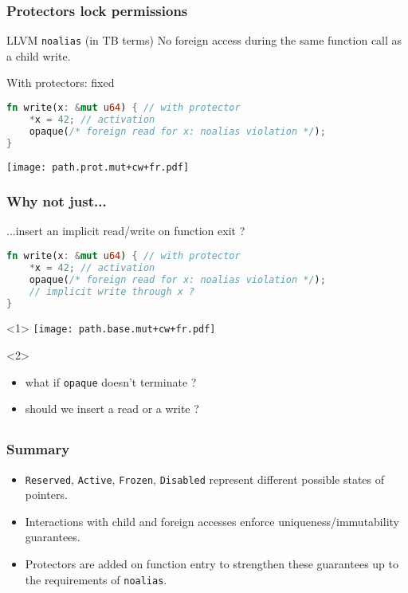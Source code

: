\begin{frame}[fragile]
    \frametitle{Protectors lock permissions}
    \begin{alertblock}{LLVM \texttt{noalias} (in TB terms)}
        No foreign access during the same function call as a child write.
    \end{alertblock}

    \begin{block}{With protectors: fixed}
        \begin{lstlisting}[language=rust, escapechar=@]
fn write(x: &mut u64) { // with protector
    *x = 42; // activation
    opaque(/* foreign read for x: noalias violation */);
}
        \end{lstlisting}
    \end{block}
    \texttt{[image: path.prot.mut+cw+fr.pdf]}
\end{frame}

\begin{frame}[fragile, t]
    \frametitle{Why not just...}
    \begin{block}{...insert an implicit read/write on function exit ?}
        \begin{lstlisting}[language=rust, escapechar=@]
fn write(x: &mut u64) { // with protector
    *x = 42; // activation
    opaque(/* foreign read for x: noalias violation */);
    // implicit write through x ?
}
        \end{lstlisting}
    \end{block}
    \begin{onlyenv}<1>
        \texttt{[image: path.base.mut+cw+fr.pdf]}
    \end{onlyenv}
    \begin{onlyenv}<2>
        \begin{itemize}
            \item what if \texttt{opaque} doesn't terminate ?
            \item should we insert a read or a write ?
        \end{itemize}
    \end{onlyenv}
\end{frame}


\subsection*{}

\begin{frame}
    \frametitle{Summary}
    \begin{itemize}
        \item \texttt{Reserved}, \texttt{Active}, \texttt{Frozen}, \texttt{Disabled}
            represent different possible states of pointers.\\
        \item Interactions with child and foreign accesses enforce uniqueness/immutability guarantees.
        \item Protectors are added on function entry to strengthen these guarantees up to the
            requirements of \texttt{noalias}.\\
    \end{itemize}
\end{frame}
